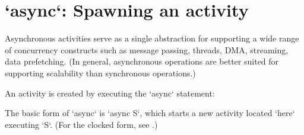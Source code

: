 \section{\xcd`async`: Spawning an activity}\label{AsynchronousActivity}\label{AsyncActivity}

Asynchronous activities serve as a single abstraction for supporting a
wide range of concurrency constructs such as message passing, threads,
DMA, streaming, data prefetching. (In general, asynchronous operations
are better suited for supporting scalability than synchronous
operations.)

An activity is created by executing the \xcd`async` statement: 



The basic form of \xcd`async` is \xcd`async S`, which starts a new activity
located \xcd`here` executing \xcd`S`.   (For the clocked form, see
.)  



